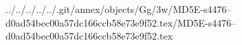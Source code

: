 ../../../../../.git/annex/objects/Gg/3w/MD5E-s4476--d0ad54bec00a57dc166ccb58e73e9f52.tex/MD5E-s4476--d0ad54bec00a57dc166ccb58e73e9f52.tex
